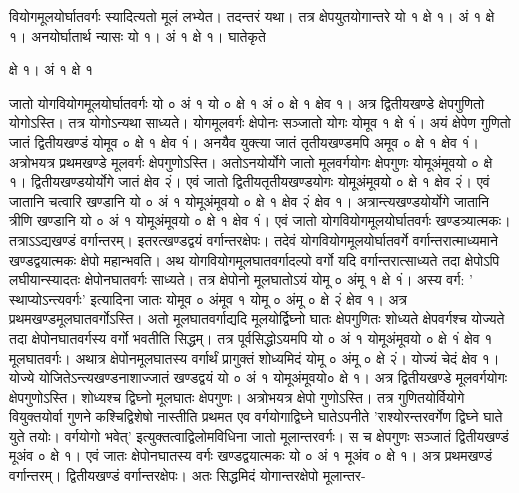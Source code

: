 \documentclass[11pt, openany]{book}
\begin{document}
\begin{sloppypar}
\hangindent=0.2in वियोगमूलयोर्घातवर्गः स्यादित्यतो मूलं लभ्येत। तदन्तरं यथा। तत्र क्षेपयुतयोगान्तरे यो १ क्षे १। अं १ क्षे १। अनयोर्घातार्थ न्यासः यो १। अं १ क्षे १। घातेकृते

\hspace{2.05in}क्षे १। अं १ क्षे १

\hangindent=0.2in जातो योगवियोगमूलयोर्घातवर्गः यो ० अं १ यो ० क्षे १ अं ० क्षे १ क्षेव १। अत्र द्वितीयखण्डे क्षेपगुणितो योगोऽस्ति। तत्र योगोऽन्यथा साध्यते। योगमूलवर्गः क्षेपोनः सञ्जातो योगः योमूव १ क्षे १ं। अयं क्षेपेण गुणितो जातं द्वितीयखण्डं योमूव ० क्षे १ क्षेव १ं। अनयैव युक्त्या जातं तृतीयखण्डमपि अमूव ० क्षे १ क्षेव १ं। अत्रोभयत्र प्रथमखण्डे मूलवर्गः क्षेपगुणोऽस्ति। अतोऽनयोर्योगे जातो मूलवर्गयोगः क्षेपगुणः योमूअंमूवयो ० क्षे १। द्वितीयखण्डयोर्योगे जातं क्षेव २ं। एवं जातो द्वितीयतृतीयखण्डयोगः योमूअंमूवयो ० क्षे १ क्षेव २ं। एवं जातानि चत्वारि खण्डानि यो ० अं १ योमूअंमूवयो ० क्षे १ क्षेव २ं क्षेव १। अत्रान्त्यखण्डयोर्योगे जातानि त्रीणि खण्डानि यो ० अं १ योमूअंमूवयो ० क्षे १ क्षेव १ं। एवं जातो योगवियोगमूलयोर्घातवर्गः खण्डत्र्यात्मकः। तत्राऽऽद्यखण्डं वर्गान्तरम्। इतरत्खण्डद्वयं वर्गान्तरक्षेपः। तदेवं योगवियोगमूलयोर्घातवर्गे वर्गान्तरात्माध्यमाने खण्डद्वयात्मकः क्षेपो महान्भवति। अथ योगवियोगमूलघातवर्गादल्पो वर्गो यदि वर्गान्तरात्साध्यते तदा क्षेपोऽपि लघीयान्स्यादतः क्षेपोनघातवर्गः साध्यते। तत्र क्षेपोनो मूलघातोऽयं योमू ० अंमू १ क्षे १ं। अस्य वर्ग: ' स्थाप्योऽन्त्यवर्गः' इत्यादिना जातः योमूव ० अंमूव १ योमू ० अंमू ० क्षे २ं क्षेव १। अत्र प्रथमखण्डमूलघातवर्गोऽस्ति। अतो मूलघातवर्गाद्यदि मूलयोर्द्विघ्नो घातः क्षेपगुणितः शोध्यते क्षेपवर्गश्च योज्यते तदा क्षेपोनघातवर्गस्य वर्गो भवतीति सिद्धम्। तत्र पूर्वसिद्धोऽयमपि यो ० अं १ योमूअंमूवयो ० क्षे १ं क्षेव १ मूलघातवर्गः। अथात्र क्षेपोनमूलघातस्य वर्गार्थं प्रागुक्तं शोध्यमिदं योमू ० अंमू ० क्षे २ं। योज्यं चेदं क्षेव १। योज्ये योजितेऽन्त्यखण्डनाशाज्जातं खण्डद्वयं यो ० अं १ योमूअंमूवयो० क्षे १। अत्र द्वितीयखण्डे मूलवर्गयोगः क्षेपगुणोऽस्ति। शोध्यश्च द्विघ्नो मूलघातः क्षेपगुणः। अत्रोभयत्र क्षेपो गुणोऽस्ति। तत्र गुणितयोर्वियोगे वियुक्तयोर्वा गुणने कश्चिद्विशेषो नास्तीति प्रथमत एव वर्गयोगाद्विघ्ने घातेऽपनीते 'राश्योरन्तरवर्गेण द्विघ्ने घाते युते तयोः। वर्गयोगो भवेत्' इत्युक्तत्वाद्विलोमविधिना जातो मूलान्तरवर्गः। स च क्षेपगुणः सञ्जातं द्वितीयखण्डं मूअंव ० क्षे १। एवं जातः क्षेपोनघातस्य वर्गः खण्डद्वयात्मकः यो ० अं १ मूअंव ० क्षे १। अत्र प्रथमखण्डं वर्गान्तरम्। द्वितीयखण्डं वर्गान्तरक्षेपः। अतः सिद्धमिदं योगान्तरक्षेपो मूलान्तर-
\end{sloppypar}
\thispagestyle{empty}
\newpage
\end{document}
